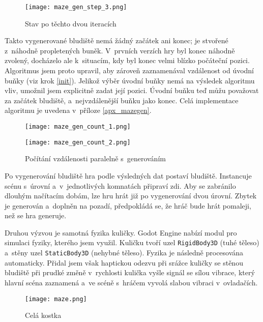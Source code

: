 \begin{figure}[H]
  \centering
  \texttt{[image: maze\_gen\_step\_3.png]}
  \caption{Stav po těchto dvou iteracích}
\end{figure}

Takto vygenerované bludiště nemá žádný začátek ani konec; je stvořené z~náhodně propletených buněk. V~prvních verzích hry byl konec náhodně zvolený, docházelo ale k~situacím, kdy byl konec velmi blízko počáteční pozici. Algoritmus jsem proto upravil, aby zároveň zaznamenával vzdálenost od úvodní buňky (viz krok \ref{init}). Jelikož výběr úvodní buňky nemá na výsledek algoritmu vliv, umožnil jsem explicitně zadat její pozici. Úvodní buňku teď můžu považovat za začátek bludiště, a~nejvzdálenější buňku jako konec. Celá implementace algoritmu je uvedena v~příloze \ref{apx_mazegen}.

\begin{figure}[H]
  \centering

  \begin{minipage}{.5\textwidth}
    \centering
    \texttt{[image: maze\_gen\_count\_1.png]}
  \end{minipage}%
  \begin{minipage}{.5\textwidth}
    \centering
    \texttt{[image: maze\_gen\_count\_2.png]}
  \end{minipage}

  \caption{Počítání vzdálenosti paralelně s~generováním}
\end{figure}

Po vygenerování bludiště hra podle výsledných dat postaví bludiště. Instancuje scénu s~úrovní a~v~jednotlivých komnatách připraví zdi. Aby se zabránilo dlouhým načítacím dobám, lze hru hrát již po vygenerování dvou úrovní. Zbytek je generován a~doplněn na pozadí, předpokládá se, že hráč bude hrát pomaleji, než se hra generuje.

Druhou výzvou je samotná fyzika kuličky. Godot Engine nabízí modul pro simulaci fyziky, kterého jsem využil. Kuličku tvoří uzel \texttt{RigidBody3D} (tuhé těleso) a~stěny uzel \texttt{StaticBody3D} (nehybné těleso). Fyzika je následně procesována automaticky. Přidal jsem však haptickou odezvu při srážce kuličky se stěnou bludiště \poml při prudké změně v~rychlosti kulička vyšle signál se sílou vibrace, který hlavní scéna zaznamená a~ve scéně s~hráčem vyvolá slabou vibraci v~ovladačích.

\begin{figure}[H]
  \centering
  \texttt{[image: maze.png]}
  \caption{Celá kostka}
  \label{maze_fig}
\end{figure}

